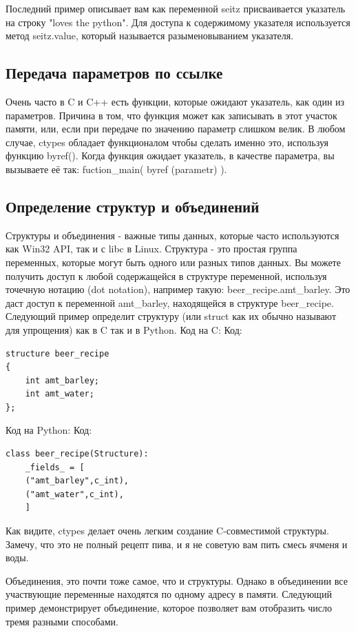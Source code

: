 \documentclass[12pt]{book}
\begin{document}
Последний пример описывает вам как переменной seitz присваивается указатель на строку "loves the python". Для доступа к содержимому указателя используется метод seitz.value, который называется разыменовыванием указателя.

\subsection{Передача параметров по ссылке}

Очень часто в C и C++ есть функции, которые ожидают указатель, как один из параметров. Причина в том, что функция может как записывать в этот участок памяти, или, если при передаче по значению параметр слишком велик. В любом случае, ctypes обладает функционалом чтобы сделать именно это, используя функцию byref(). Когда функция ожидает указатель, в качестве параметра, вы вызываете её так: fuction\_main( byref (parametr) ).

\subsection{Определение структур и объединений}

Структуры и объединения - важные типы данных, которые часто используются как Win32 API, так и с libc в Linux. Структура - это простая группа переменных, которые могут быть одного или разных типов данных. Вы можете получить доступ к любой содержащейся в структуре переменной, используя точечную нотацию (dot notation), например такую: beer\_recipe.amt\_barley. Это даст доступ к переменной amt\_barley, находящейся в структуре beer\_recipe. Следующий пример определит структуру (или struct как их обычно называют для упрощения) как в C так и в Python.
Код на C:
Код:
\begin{lstlisting}
structure beer_recipe
{
    int amt_barley;
    int amt_water;
};
\end{lstlisting}
Код на Python:
Код:
\begin{lstlisting}
class beer_recipe(Structure):
    _fields_ = [
    ("amt_barley",c_int),
    ("amt_water",c_int),
    ]
\end{lstlisting}
Как видите, ctypes делает очень легким создание C-совместимой структуры. Замечу, что это не полный рецепт пива, и я не советую вам пить смесь ячменя и воды.

Объединения, это почти тоже самое, что и структуры. Однако в объединении все участвующие переменные находятся по одному адресу в памяти. Следующий пример демонстрирует объединение, которое позволяет вам отобразить число тремя разными способами.
\end{document}
